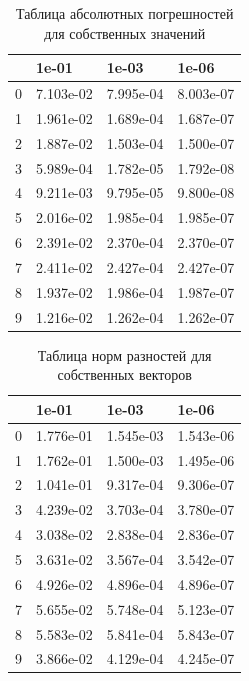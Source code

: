 \documentclass[a4paper]{article}
\begin{document}
\begin{table}
\centering
\caption{Таблица абсолютных погрешностей для собственных значений}
\label{table_eigenvals}
\begin{tabular}{|l|l|l|l|}
\hline
{} &      1e-01 &      1e-03 &      1e-06 \\
\hline
0 &  7.103e-02 &  7.995e-04 &  8.003e-07 \\
\hline
1 &  1.961e-02 &  1.689e-04 &  1.687e-07 \\
\hline
2 &  1.887e-02 &  1.503e-04 &  1.500e-07 \\
\hline
3 &  5.989e-04 &  1.782e-05 &  1.792e-08 \\
\hline
4 &  9.211e-03 &  9.795e-05 &  9.800e-08 \\
\hline
5 &  2.016e-02 &  1.985e-04 &  1.985e-07 \\
\hline
6 &  2.391e-02 &  2.370e-04 &  2.370e-07 \\
\hline
7 &  2.411e-02 &  2.427e-04 &  2.427e-07 \\
\hline
8 &  1.937e-02 &  1.986e-04 &  1.987e-07 \\
\hline
9 &  1.216e-02 &  1.262e-04 &  1.262e-07 \\
\hline
\end{tabular}
\end{table}


\begin{table}
\centering
\caption{Таблица норм разностей для собственных векторов}
\label{table_eigenvecs}
\begin{tabular}{|l|l|l|l|}
\hline
{} &      1e-01 &      1e-03 &      1e-06 \\
\hline
0 &  1.776e-01 &  1.545e-03 &  1.543e-06 \\
\hline
1 &  1.762e-01 &  1.500e-03 &  1.495e-06 \\
\hline
2 &  1.041e-01 &  9.317e-04 &  9.306e-07 \\
\hline
3 &  4.239e-02 &  3.703e-04 &  3.780e-07 \\
\hline
4 &  3.038e-02 &  2.838e-04 &  2.836e-07 \\
\hline
5 &  3.631e-02 &  3.567e-04 &  3.542e-07 \\
\hline
6 &  4.926e-02 &  4.896e-04 &  4.896e-07 \\
\hline
7 &  5.655e-02 &  5.748e-04 &  5.123e-07 \\
\hline
8 &  5.583e-02 &  5.841e-04 &  5.843e-07 \\
\hline
9 &  3.866e-02 &  4.129e-04 &  4.245e-07 \\
\hline
\end{tabular}
\end{table}
\end{document}
